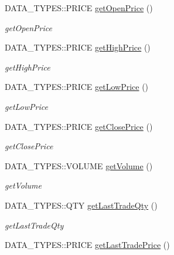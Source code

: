 \begin{DoxyCompactItemize}
\item 
D\-A\-T\-A\-\_\-\-T\-Y\-P\-E\-S\-::\-P\-R\-I\-C\-E \hyperlink{class_a_p_i2_1_1_c_o_m_m_o_n_1_1_mkt_data_a8211f710536b63d9314b784b1ee7fbd6}{get\-Open\-Price} ()
\begin{DoxyCompactList}\small\item\em get\-Open\-Price \end{DoxyCompactList}\item 
D\-A\-T\-A\-\_\-\-T\-Y\-P\-E\-S\-::\-P\-R\-I\-C\-E \hyperlink{class_a_p_i2_1_1_c_o_m_m_o_n_1_1_mkt_data_a5e19df584bf4ab79a98ffd56bb10c1ae}{get\-High\-Price} ()
\begin{DoxyCompactList}\small\item\em get\-High\-Price \end{DoxyCompactList}\item 
D\-A\-T\-A\-\_\-\-T\-Y\-P\-E\-S\-::\-P\-R\-I\-C\-E \hyperlink{class_a_p_i2_1_1_c_o_m_m_o_n_1_1_mkt_data_a1356652aa23866fd25bcaadda01d8889}{get\-Low\-Price} ()
\begin{DoxyCompactList}\small\item\em get\-Low\-Price \end{DoxyCompactList}\item 
D\-A\-T\-A\-\_\-\-T\-Y\-P\-E\-S\-::\-P\-R\-I\-C\-E \hyperlink{class_a_p_i2_1_1_c_o_m_m_o_n_1_1_mkt_data_a575943cc7e3a507003973f96e9eb1b52}{get\-Close\-Price} ()
\begin{DoxyCompactList}\small\item\em get\-Close\-Price \end{DoxyCompactList}\item 
D\-A\-T\-A\-\_\-\-T\-Y\-P\-E\-S\-::\-V\-O\-L\-U\-M\-E \hyperlink{class_a_p_i2_1_1_c_o_m_m_o_n_1_1_mkt_data_aaf5521f2f0225420a1a630c77c9e586f}{get\-Volume} ()
\begin{DoxyCompactList}\small\item\em get\-Volume \end{DoxyCompactList}\item 
D\-A\-T\-A\-\_\-\-T\-Y\-P\-E\-S\-::\-Q\-T\-Y \hyperlink{class_a_p_i2_1_1_c_o_m_m_o_n_1_1_mkt_data_ab153a1910684543f3482e8cb3118c919}{get\-Last\-Trade\-Qty} ()
\begin{DoxyCompactList}\small\item\em get\-Last\-Trade\-Qty \end{DoxyCompactList}\item 
D\-A\-T\-A\-\_\-\-T\-Y\-P\-E\-S\-::\-P\-R\-I\-C\-E \hyperlink{class_a_p_i2_1_1_c_o_m_m_o_n_1_1_mkt_data_a77c7ab13a4bcd33586d534b9170503f4}{get\-Last\-Trade\-Price} ()

\end{DoxyCompactItemize}
